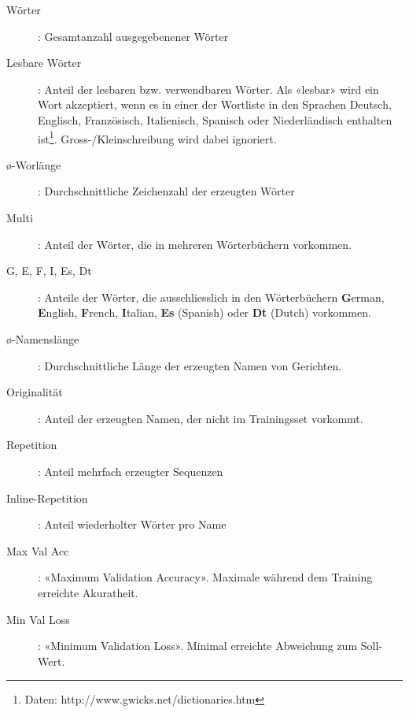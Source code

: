 \begin{description}
\item[Wörter]: Gesamtanzahl ausgegebenener Wörter
\item[Lesbare Wörter]: Anteil der lesbaren bzw. verwendbaren Wörter.
Als «lesbar» wird ein Wort akzeptiert, wenn es in einer der Wortliste in den Sprachen Deutsch, Englisch, Französisch, Italienisch, Spanisch oder Niederländisch enthalten ist\footnote{Daten: http://www.gwicks.net/dictionaries.htm}.
Gross-/Kleinschreibung wird dabei ignoriert.
\item[ø-Worlänge]: Durchschnittliche Zeichenzahl der erzeugten Wörter
\item[Multi]: Anteil der Wörter, die in mehreren Wörterbüchern vorkommen.
\item[G, E, F, I, Es, Dt]: Anteile der Wörter, die ausschliesslich in den Wörterbüchern \textbf{G}erman, \textbf{E}nglish, \textbf{F}rench, \textbf{I}talian, \textbf{Es} (Spanish) oder \textbf{Dt} (Dutch) vorkommen.
\item[ø-Namenslänge]: Durchschnittliche Länge der erzeugten Namen von Gerichten.
\item[Originalität]: Anteil der erzeugten Namen, der nicht im Trainingsset vorkommt.
\item[Repetition]: Anteil mehrfach erzeugter Sequenzen
\item[Inline-Repetition]: Anteil wiederholter Wörter pro Name
\item[Max Val Acc]: «Maximum Validation Accuracy».
Maximale während dem Training erreichte Akuratheit.
\item[Min Val Loss]: «Minimum Validation Loss».
Minimal erreichte Abweichung zum Soll-Wert.
\end{description}


